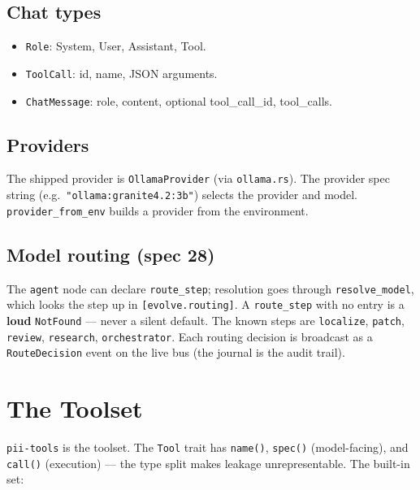 \documentclass[
	fontsize=10pt,
	twoside=false,
	secnumdepth=2,
	open=any,
]{kaobook}
\begin{document}
\section{Chat types}

\begin{itemize}
    \item \texttt{Role}: System, User, Assistant, Tool.
    \item \texttt{ToolCall}: id, name, JSON arguments.
    \item \texttt{ChatMessage}: role, content, optional tool\_call\_id,
        tool\_calls.
\end{itemize}

\section{Providers}

The shipped provider is \texttt{OllamaProvider} (via \texttt{ollama.rs}).
The provider spec string (e.g.\ \texttt{"ollama:granite4.2:3b"}) selects
the provider and model. \texttt{provider\_from\_env} builds a provider
from the environment.

\section{Model routing (spec 28)}

The \texttt{agent} node can declare \texttt{route\_step}; resolution goes
through \texttt{resolve\_model}, which looks the step up in
\texttt{[evolve.routing]}. A \texttt{route\_step} with no entry is a
\textbf{loud} \texttt{NotFound} — never a silent default. The known steps
are \texttt{localize}, \texttt{patch}, \texttt{review}, \texttt{research},
\texttt{orchestrator}. Each routing decision is broadcast as a
\texttt{RouteDecision} event on the live bus (the journal is the audit
trail).

\chapter{The Toolset}
\label{chap:tools}

\texttt{pii-tools} is the toolset. The \texttt{Tool} trait has
\texttt{name()}, \texttt{spec()} (model-facing), and \texttt{call()}
(execution) — the type split makes leakage unrepresentable. The built-in
set:
\end{document}
